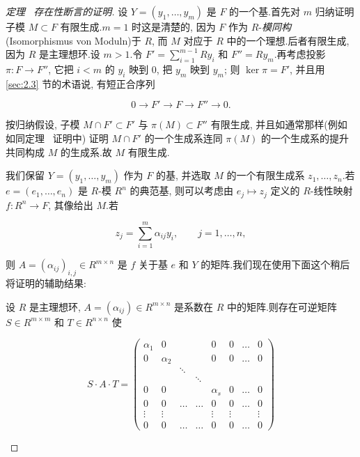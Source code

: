 \begin{proof}[定理~ 存在性断言的证明]
设 $Y = (y_1, \ldots, y_m)$ 是 $F$ 的一个基.首先对 $m$ 归纳证明子模 $M \subset F$ 有限生成.$m = 1$ 时这是清楚的, 因为 $F$ 作为 $R$-\emph{模同构}(\textup{Isomorphismus von Moduln})于 $R$, 而 $M$ 对应于 $R$ 中的一个理想.后者有限生成, 因为 $R$ 是主理想环.设 $m > 1$.令 $F' = \sum_{i = 1}^{m - 1} R y_i$ 和 $F'' = R y_m$.再考虑投影 $\pi \colon F \longrightarrow F''$, 它把 $i < m$ 的 $y_i$ 映到 $0$, 把 $y_m$ 映到 $y_m$; 则 $\ker \pi = F'$, 并且用 \ref{sec:2.3} 节的术语说, 有短正合序列

\[
0 \longrightarrow F' \longrightarrow F \longrightarrow F'' \longrightarrow 0\text{.}\]

按归纳假设, 子模 $M \cap F' \subset F'$ 与 $\pi(M) \subset F''$ 有限生成, 并且如通常那样(例如如同定理~ 证明中) 证明 $M \cap F'$ 的一个生成系连同 $\pi(M)$ 的一个生成系的提升共同构成 $M$ 的生成系.故 $M$ 有限生成.

我们保留 $Y = (y_1, \ldots, y_m)$ 作为 $F$ 的基, 并选取 $M$ 的一个有限生成系 $z_1, \ldots, z_n$.若 $e = (e_1, \ldots, e_n)$ 是 $R$-模 $R^n$ 的典范基, 则可以考虑由 $e_j \longmapsto z_j$ 定义的 $R$-线性映射 $f \colon R^n \longrightarrow F$, 其像给出 $M$.若

\[
z_j = \sum_{i = 1}^{m} \alpha_{ij} y_i, \qquad j = 1, \ldots, n,\]

则 $A = (\alpha_{ij})_{i, j} \in R^{m \times n}$ 是 $f$ 关于基 $e$ 和 $Y$ 的矩阵.我们现在使用下面这个稍后将证明的辅助结果:

\begin{lemma}\label{lem:6.3.5}
设 $R$ 是主理想环, $A = (\alpha_{ij}) \in R^{m \times n}$ 是系数在 $R$ 中的矩阵.则存在可逆矩阵 $S \in R^{m \times m}$ 和 $T \in R^{n \times n}$ 使

\[
S \cdot A \cdot T = \left(\begin{array}{cccccccc}
\alpha_1 & 0 & & & 0 & 0 & \ldots & 0 \\
0 & \alpha_2 & & & 0 & 0 & \ldots & 0 \\
 & & \ddots & & & & & \\
 & & & \ddots & & & & \\
0 & 0 & & & \alpha_s & 0 & \ldots & 0 \\
0 & 0 & \ldots & \ldots & 0 & 0 & \ldots & 0 \\
\vdots & \vdots & & & \vdots & \vdots & & \vdots \\
0 & 0 & \ldots & \ldots & 0 & 0 & \ldots & 0
\end{array}\right)\]


\end{lemma}
\end{proof}
